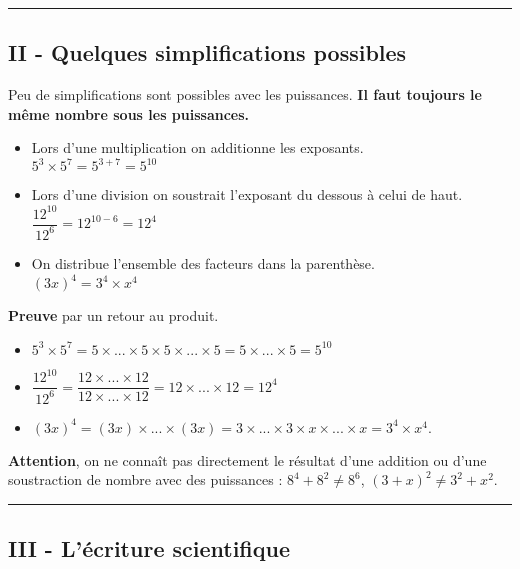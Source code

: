 \documentclass[10pt]{article}
\newcommand{\horrule}[1]{\rule{\linewidth}{#1}} %
\begin{document}
\horrule{0.5px}

\subsection*{II - Quelques simplifications possibles}

\begin{multicols}{2}

  \begin{Proposition} {Peu de simplifications sont possibles avec les puissances. \textbf{Il faut toujours le même nombre sous les puissances.}}
    \begin{itemize}
    \item Lors d'une multiplication on additionne les exposants. \\
      $5^3 \times 5^7 = 5^{3+7} = 5^{10}$
    \item Lors d'une division on soustrait l'exposant du dessous à celui de haut. \\
      $\dfrac{12^{10}}{12^{6}} = 12^{10 - 6} = 12^4$
    \item On distribue l'ensemble des facteurs dans la parenthèse. \\
      $(3 x)^4 = 3^4 \times x^4$
    \end{itemize}
  \end{Proposition}

  \textbf{Preuve} par un retour au produit.
  
  \begin{itemize}
  \item $5^3 \times 5^7 = 5 \times ... \times 5 \times  5 \times ... \times 5 =  5 \times ... \times 5 = 5^{10}$
  \item $\dfrac{12^{10}}{12^{6}} = \dfrac{12 \times ... \times 12}{12 \times ... \times 12} =12 \times ... \times 12 = 12^4$
  \item $(3 x)^4 = (3x) \times ... \times (3x) = 3 \times ... \times 3 \times x \times ... \times x = 3^4 \times x^4.$
  \end{itemize}

\end{multicols}

\textbf{Attention}, on ne connaît pas directement le résultat d'une addition ou d'une soustraction de nombre avec des puissances : $8^4 + 8^2 \neq 8^6$, $(3 + x)^2 \neq 3^2 + x^2 $.

\horrule{0.5px}

\subsection*{ III - L'écriture scientifique}
\end{document}
